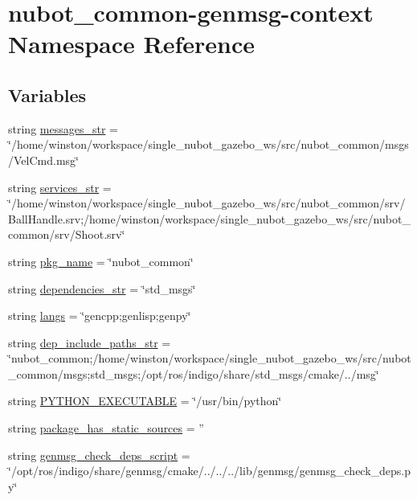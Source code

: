 \hypertarget{namespacenubot__common-genmsg-context}{\section{nubot\-\_\-common-\/genmsg-\/context Namespace Reference}
\label{namespacenubot__common-genmsg-context}
}
\subsection*{Variables}
\begin{DoxyCompactItemize}
\item 
string \hyperlink{namespacenubot__common-genmsg-context_a9d82d20e4ffa677c598751d6630dc734}{messages\-\_\-str} = \char`\"{}/home/winston/workspace/single\-\_\-nubot\-\_\-gazebo\-\_\-ws/src/nubot\-\_\-common/msgs/Vel\-Cmd.\-msg\char`\"{}
\item 
string \hyperlink{namespacenubot__common-genmsg-context_a1e2a824c1778c805a4593863a72ba35e}{services\-\_\-str} = \char`\"{}/home/winston/workspace/single\-\_\-nubot\-\_\-gazebo\-\_\-ws/src/nubot\-\_\-common/srv/Ball\-Handle.\-srv;/home/winston/workspace/single\-\_\-nubot\-\_\-gazebo\-\_\-ws/src/nubot\-\_\-common/srv/Shoot.\-srv\char`\"{}
\item 
string \hyperlink{namespacenubot__common-genmsg-context_aa7e82af182943505146665259b8e1ce9}{pkg\-\_\-name} = \char`\"{}nubot\-\_\-common\char`\"{}
\item 
string \hyperlink{namespacenubot__common-genmsg-context_acb3057b57eb9458421378baa13f383d0}{dependencies\-\_\-str} = \char`\"{}std\-\_\-msgs\char`\"{}
\item 
string \hyperlink{namespacenubot__common-genmsg-context_ad47fe39b5ca574c609a0a44451d67ebe}{langs} = \char`\"{}gencpp;genlisp;genpy\char`\"{}
\item 
string \hyperlink{namespacenubot__common-genmsg-context_a3cb8468ce84e82ac5e2b66290f260f4c}{dep\-\_\-include\-\_\-paths\-\_\-str} = \char`\"{}nubot\-\_\-common;/home/winston/workspace/single\-\_\-nubot\-\_\-gazebo\-\_\-ws/src/nubot\-\_\-common/msgs;std\-\_\-msgs;/opt/ros/indigo/share/std\-\_\-msgs/cmake/../msg\char`\"{}
\item 
string \hyperlink{namespacenubot__common-genmsg-context_a07f30a33447f3b83a20605f1732e2763}{P\-Y\-T\-H\-O\-N\-\_\-\-E\-X\-E\-C\-U\-T\-A\-B\-L\-E} = \char`\"{}/usr/bin/python\char`\"{}
\item 
string \hyperlink{namespacenubot__common-genmsg-context_a9b23bed4614ce829e09eb98736bbcfb6}{package\-\_\-has\-\_\-static\-\_\-sources} = ''
\item 
string \hyperlink{namespacenubot__common-genmsg-context_a32a0523eb31dd66d816b3d32bd6aa2b5}{genmsg\-\_\-check\-\_\-deps\-\_\-script} = \char`\"{}/opt/ros/indigo/share/genmsg/cmake/../../../lib/genmsg/genmsg\-\_\-check\-\_\-deps.\-py\char`\"{}
\end{DoxyCompactItemize}


